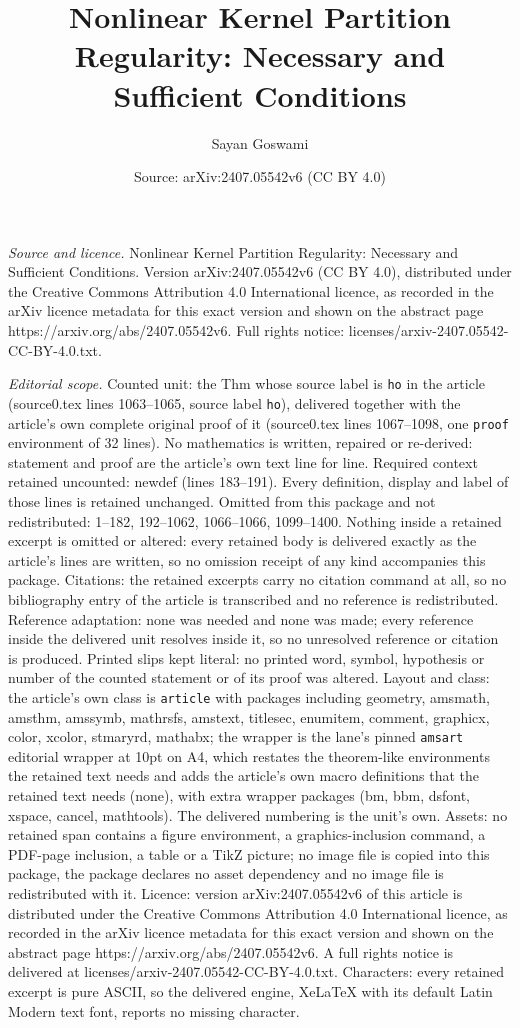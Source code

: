 \documentclass[10pt,a4paper]{amsart}
\title[Nonlinear Kernel Partition Regularity: Necessary and Suffici]{Nonlinear Kernel Partition Regularity: Necessary and Sufficient Conditions}
\author{Sayan Goswami}
\date{Source: arXiv:2407.05542v6 (CC BY 4.0)}
\begin{document}
\maketitle

\noindent\emph{Source and licence.} Nonlinear Kernel Partition Regularity: Necessary and Sufficient Conditions. Version arXiv:2407.05542v6 (CC BY 4.0), distributed under the Creative Commons Attribution 4.0 International licence, as recorded in the arXiv licence metadata for this exact version and shown on the abstract page https://arxiv.org/abs/2407.05542v6. Full rights notice: licenses/arxiv-2407.05542-CC-BY-4.0.txt.\par\smallskip

\noindent\textit{Editorial scope.} Counted unit: the Thm whose source label is \texttt{ho} in the article (source0.tex lines 1063--1065, source label \texttt{ho}), delivered together with the article's own complete original proof of it (source0.tex lines 1067--1098, one \texttt{proof} environment of 32 lines). No mathematics is written, repaired or re-derived: statement and proof are the article's own text line for line. Required context retained uncounted: newdef (lines 183--191). Every definition, display and label of those lines is retained unchanged. Omitted from this package and not redistributed: 1--182, 192--1062, 1066--1066, 1099--1400. Nothing inside a retained excerpt is omitted or altered: every retained body is delivered exactly as the article's lines are written, so no omission receipt of any kind accompanies this package. Citations: the retained excerpts carry no citation command at all, so no bibliography entry of the article is transcribed and no reference is redistributed. Reference adaptation: none was needed and none was made; every reference inside the delivered unit resolves inside it, so no unresolved reference or citation is produced. Printed slips kept literal: no printed word, symbol, hypothesis or number of the counted statement or of its proof was altered. Layout and class: the article's own class is \texttt{article} with packages including geometry, amsmath, amsthm, amssymb, mathrsfs, amstext, titlesec, enumitem, comment, graphicx, color, xcolor, stmaryrd, mathabx; the wrapper is the lane's pinned \texttt{amsart} editorial wrapper at 10pt on A4, which restates the theorem-like environments the retained text needs and adds the article's own macro definitions that the retained text needs (none), with extra wrapper packages (bm, bbm, dsfont, xspace, cancel, mathtools). The delivered numbering is the unit's own. Assets: no retained span contains a figure environment, a graphics-inclusion command, a PDF-page inclusion, a table or a TikZ picture; no image file is copied into this package, the package declares no asset dependency and no image file is redistributed with it. Licence: version arXiv:2407.05542v6 of this article is distributed under the Creative Commons Attribution 4.0 International licence, as recorded in the arXiv licence metadata for this exact version and shown on the abstract page https://arxiv.org/abs/2407.05542v6. A full rights notice is delivered at licenses/arxiv-2407.05542-CC-BY-4.0.txt. Characters: every retained excerpt is pure ASCII, so the delivered engine, XeLaTeX with its default Latin Modern text font, reports no missing character.
\end{document}
